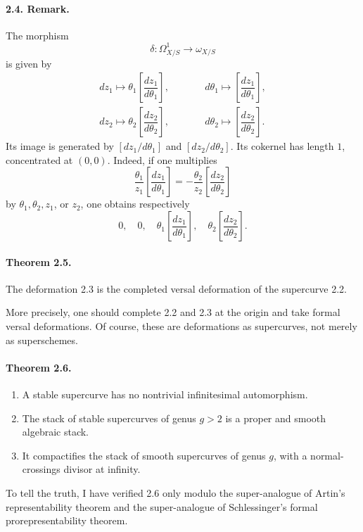 \documentclass[11pt]{article}
\begin{document}
\paragraph{2.4. Remark.}
The morphism
\[
  \delta:\Omega^1_{X/S}\longrightarrow\omega_{X/S}
\]
is given by
\[
\begin{array}{lll}
 dz_1\longmapsto \theta_1\left[\dfrac{dz_1}{d\theta_1}\right],
&\qquad& d\theta_1\longmapsto \left[\dfrac{dz_1}{d\theta_1}\right],\\[1.1ex]
 dz_2\longmapsto \theta_2\left[\dfrac{dz_2}{d\theta_2}\right],
&& d\theta_2\longmapsto \left[\dfrac{dz_2}{d\theta_2}\right].
\end{array}
\]
Its image is generated by $[dz_1/d\theta_1]$ and $[dz_2/d\theta_2]$. Its cokernel has length $1$, concentrated at $(0,0)$. Indeed, if one multiplies
\[
  \frac{\theta_1}{z_1}\left[\frac{dz_1}{d\theta_1}\right]
  =-\frac{\theta_2}{z_2}\left[\frac{dz_2}{d\theta_2}\right]
\]
by $\theta_1,\theta_2,z_1$, or $z_2$, one obtains respectively
\[
  0,
  \quad 0,
  \quad
  \theta_1\left[\frac{dz_1}{d\theta_1}\right],
  \quad
  \theta_2\left[\frac{dz_2}{d\theta_2}\right].
\]

\paragraph{Theorem 2.5.}
The deformation 2.3 is the completed versal deformation of the supercurve 2.2.

More precisely, one should complete 2.2 and 2.3 at the origin and take formal versal deformations. Of course, these are deformations as supercurves, not merely as superschemes.

\paragraph{Theorem 2.6.}
\begin{enumerate}[label=(\roman*)]
\item A stable supercurve has no nontrivial infinitesimal automorphism.
\item The stack of stable supercurves of genus $g>2$ is a proper and smooth algebraic stack.
\item It compactifies the stack of smooth supercurves of genus $g$, with a normal-crossings divisor at infinity.
\end{enumerate}

To tell the truth, I have verified 2.6 only modulo the super-analogue of Artin's representability theorem and the super-analogue of Schlessinger's formal prorepresentability theorem.
\end{document}
